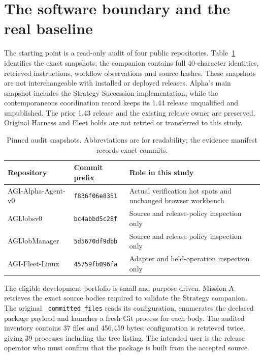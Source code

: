 \documentclass[11pt,a4paper]{article}
\newcommand{\code}[1]{\texttt{\small #1}}
\begin{document}



\section{The software boundary and the real baseline}
\label{sec:baseline}

The starting point is a read-only audit of four public repositories. Table~\ref{tab:pins} identifies the exact snapshots; the companion contains full 40-character identities, retrieved instructions, workflow observations and source hashes. These snapshots are not interchangeable with installed or deployed releases. Alpha's main snapshot includes the Strategy Succession implementation, while the contemporaneous coordination record keeps its 1.44 release unqualified and unpublished. The prior 1.43 release and the existing release owner are preserved. Original Harness and Fleet holds are not retried or transferred to this study.

\begin{table}[htbp]\centering\small
\caption{Pinned audit snapshots. Abbreviations are for readability; the evidence manifest records exact commits.}
\label{tab:pins}
\begin{tabularx}{\textwidth}{@{}l l X@{}}\toprule
Repository & Commit prefix & Role in this study\\\midrule
AGI-Alpha-Agent-v0 & \code{f836f06e8351} & Actual verification hot spots and unchanged browser workbench\\
AGIJobsv0 & \code{bc4abbd5c28f} & Source and release-policy inspection only\\
AGIJobManager & \code{5d5670df9dbb} & Source and release-policy inspection only\\
AGI-Fleet-Linux & \code{45759fb096fa} & Adapter and held-operation inspection only\\\bottomrule
\end{tabularx}
\end{table}

The eligible development portfolio is small and purpose-driven. Mission A retrieves the exact source bodies required to validate the Strategy companion. The original \code{\_committed\_files} reads its configuration, enumerates the declared package payload and launches a fresh Git process for each body. The audited inventory contains 37 files and 456,459 bytes; configuration is retrieved twice, giving 39 processes including the tree listing. The intended user is the release operator who must confirm that the package is built from the accepted source.
\end{document}

